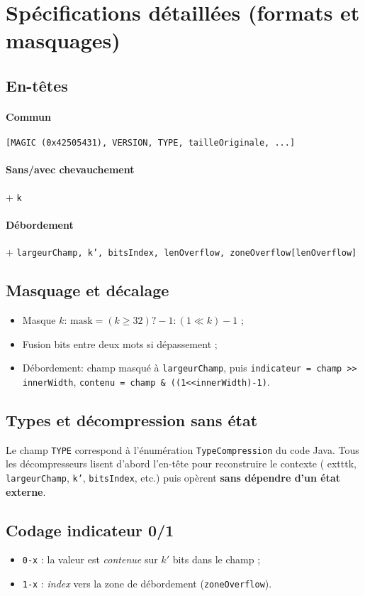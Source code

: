 \section{Spécifications détaillées (formats et masquages)}
\label{sec:specs}

\subsection{En-têtes}
\paragraph{Commun} \texttt{[MAGIC (0x42505431), VERSION, TYPE, tailleOriginale, ...]}
\paragraph{Sans/avec chevauchement} + \texttt{k}
\paragraph{Débordement} + \texttt{largeurChamp, k', bitsIndex, lenOverflow, zoneOverflow[lenOverflow]}

\subsection{Masquage et décalage}
\begin{itemize}
  \item Masque $k$: $\text{mask}=(k\ge 32)?-1:(1\ll k)-1$ ;
  \item Fusion bits entre deux mots si dépassement ;
  \item Débordement: champ masqué à \texttt{largeurChamp}, puis \texttt{indicateur = champ >> innerWidth}, \texttt{contenu = champ \& ((1<<innerWidth)-1)}.
\end{itemize}

\subsection{Types et décompression sans état}
Le champ \texttt{TYPE} correspond à l'énumération \texttt{TypeCompression} du code Java. Tous les décompresseurs lisent d'abord l'en-tête pour reconstruire le contexte (
	exttt{k}, \texttt{largeurChamp}, \texttt{k'}, \texttt{bitsIndex}, etc.) puis opèrent \textbf{sans dépendre d'un état externe}.

\subsection{Codage indicateur 0/1}
\begin{itemize}
  \item \texttt{0-x} : la valeur est \emph{contenue} sur $k'$ bits dans le champ ;
  \item \texttt{1-x} : \emph{index} vers la zone de débordement (\texttt{zoneOverflow}).
\end{itemize}
